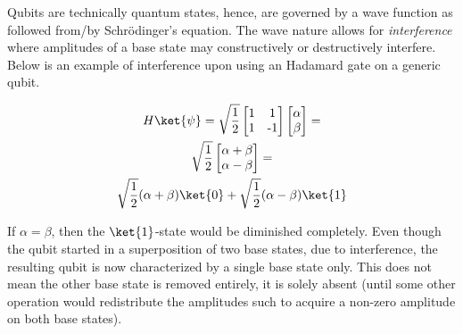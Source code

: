 \documentclass[../main.tex]{subfiles}
\begin{document}
Qubits are technically quantum states, hence, are governed by a wave function as followed from/by Schrödinger's equation. The wave nature allows for \emph{interference} where amplitudes of a base state may constructively or destructively interfere. Below is an example of interference upon using an Hadamard gate on a generic qubit.

\begin{gather*}
    H\ket{\psi} =  \sqrt{\frac{1}{2}}\begin{bmatrix} 1 & 1 \\ 1 & \text{-}1 \end{bmatrix} \begin{bmatrix}\alpha \\ \beta \end{bmatrix}  = \\ 
    \sqrt{\frac{1}{2}} \begin{bmatrix}\alpha + \beta \\ \alpha - \beta \end{bmatrix} = \\
    \sqrt{\frac{1}{2}}(\alpha + \beta) \ket{0} + \sqrt{\frac{1}{2}}(\alpha - \beta) \ket{1}
\label{eq: gate_h}
\end{gather*}

If $\alpha = \beta$, then the $\ket{1}$-state would be diminished completely. Even though the qubit started in a superposition of two base states, due to interference, the resulting qubit is now characterized by a single base state only. This does not mean the other base state is removed entirely, it is solely absent (until some other operation would redistribute the amplitudes such to acquire a non-zero amplitude on both base states).



\biblio
\end{document}
